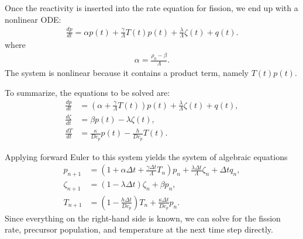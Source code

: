 Once the reactivity is inserted into the rate equation for fission, we end up with a nonlinear ODE:
\begin{align}
  \frac{dp}{dt} = \alpha p(t) + \frac{ \gamma }{ \Lambda } T(t) p(t)  + \frac{\lambda}{\Lambda} \zeta(t) + q(t).
\end{align}
where
\begin{align}
  \alpha = \frac{ \rho_0 - \beta }{ \Lambda }. \nonumber
\end{align}
The system is nonlinear because it contains a product term, namely $T(t) p(t)$.

To summarize, the equations to be solved are:
\begin{subequations}
\begin{align}
  \frac{dp}{dt} &= \left( \alpha  + \frac{ \gamma }{ \Lambda } T(t) \right) p(t)  + \frac{\lambda}{\Lambda} \zeta(t) + q(t), \\
  \frac{d\zeta}{dt} &= \beta p(t) - \lambda \zeta(t), \\
  \frac{dT}{dt} &= \frac{\kappa}{D c_p } p(t) - \frac{h}{D c_p } T(t) .
\end{align}
\end{subequations}

Applying forward Euler to this system yields the system of algebraic equations
\begin{subequations}
\begin{align}
  p_{n+1}     &= \left( 1 + \alpha \Delta t + \frac{ \gamma \Delta t }{ \Lambda } T_n \right) p_n + \frac{\lambda \Delta t}{\Lambda} \zeta_n + \Delta t q_n, \\
  \zeta_{n+1} &= ( 1 - \lambda \Delta t ) \zeta_n + \beta p_n, \\
  T_{n+1}     &= \left( 1 - \frac{h \Delta t}{D c_p } \right) T_n + \frac{\kappa \Delta t}{D c_p } p_n .
\end{align}
\end{subequations}
Since everything on the right-hand side is known, we can solve for the fission rate, precursor population, and temperature at the next time step directly.

